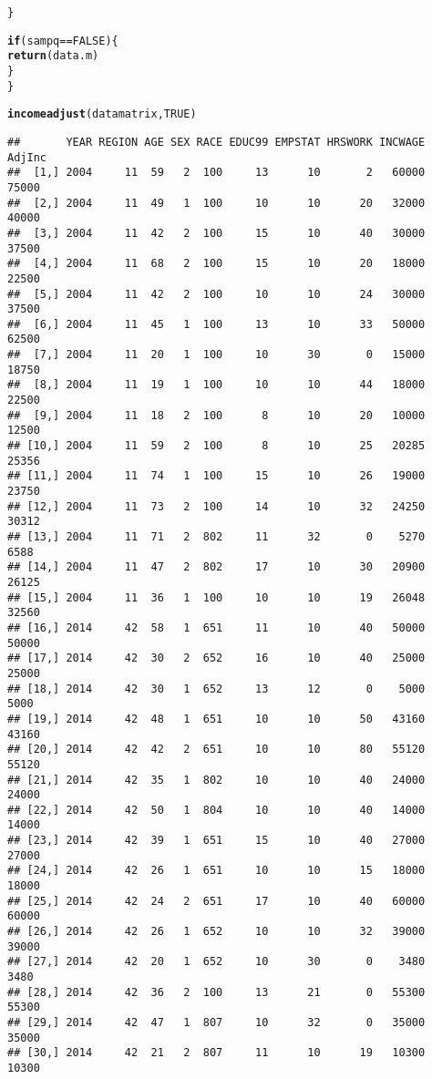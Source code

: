 \documentclass{article}\usepackage[]{graphicx}\usepackage[]{color}
\makeatletter
\newcommand{\hlnum}[1]{\textcolor[rgb]{0.686,0.059,0.569}{#1}}%
\newcommand{\hlopt}[1]{\textcolor[rgb]{0,0,0}{#1}}%
\newcommand{\hlstd}[1]{\textcolor[rgb]{0.345,0.345,0.345}{#1}}%
\newcommand{\hlkwa}[1]{\textcolor[rgb]{0.161,0.373,0.58}{\textbf{#1}}}%
\newcommand{\hlkwd}[1]{\textcolor[rgb]{0.737,0.353,0.396}{\textbf{#1}}}%
\newenvironment{kframe}{%
 \def\at@end@of@kframe{}%
 \ifinner\ifhmode%
  \def\at@end@of@kframe{\end{minipage}}%
  \begin{minipage}{\columnwidth}%
 \fi\fi%
 \def\FrameCommand##1{\hskip\@totalleftmargin \hskip-\fboxsep
 \colorbox{shadecolor}{##1}\hskip-\fboxsep
     \hskip-\linewidth \hskip-\@totalleftmargin \hskip\columnwidth}%
 \MakeFramed {\advance\hsize-\width
   \@totalleftmargin\z@ \linewidth\hsize
   \@setminipage}}%
 {\par\unskip\endMakeFramed%
 \at@end@of@kframe}
\newenvironment{knitrout}{}{} %
\makeatother
\begin{document}
\begin{knitrout}
\begin{kframe}
\begin{alltt}
 \hlstd{\}}

 \hlkwa{if} \hlstd{(sampq} \hlopt{==} \hlnum{FALSE}\hlstd{)\{}
   \hlkwd{return}\hlstd{(data.m)}
 \hlstd{\}}
\hlstd{\}}

\hlkwd{incomeadjust}\hlstd{(datamatrix,} \hlnum{TRUE}\hlstd{)}
\end{alltt}
\begin{verbatim}
##       YEAR REGION AGE SEX RACE EDUC99 EMPSTAT HRSWORK INCWAGE AdjInc
##  [1,] 2004     11  59   2  100     13      10       2   60000  75000
##  [2,] 2004     11  49   1  100     10      10      20   32000  40000
##  [3,] 2004     11  42   2  100     15      10      40   30000  37500
##  [4,] 2004     11  68   2  100     15      10      20   18000  22500
##  [5,] 2004     11  42   2  100     10      10      24   30000  37500
##  [6,] 2004     11  45   1  100     13      10      33   50000  62500
##  [7,] 2004     11  20   1  100     10      30       0   15000  18750
##  [8,] 2004     11  19   1  100     10      10      44   18000  22500
##  [9,] 2004     11  18   2  100      8      10      20   10000  12500
## [10,] 2004     11  59   2  100      8      10      25   20285  25356
## [11,] 2004     11  74   1  100     15      10      26   19000  23750
## [12,] 2004     11  73   2  100     14      10      32   24250  30312
## [13,] 2004     11  71   2  802     11      32       0    5270   6588
## [14,] 2004     11  47   2  802     17      10      30   20900  26125
## [15,] 2004     11  36   1  100     10      10      19   26048  32560
## [16,] 2014     42  58   1  651     11      10      40   50000  50000
## [17,] 2014     42  30   2  652     16      10      40   25000  25000
## [18,] 2014     42  30   1  652     13      12       0    5000   5000
## [19,] 2014     42  48   1  651     10      10      50   43160  43160
## [20,] 2014     42  42   2  651     10      10      80   55120  55120
## [21,] 2014     42  35   1  802     10      10      40   24000  24000
## [22,] 2014     42  50   1  804     10      10      40   14000  14000
## [23,] 2014     42  39   1  651     15      10      40   27000  27000
## [24,] 2014     42  26   1  651     10      10      15   18000  18000
## [25,] 2014     42  24   2  651     17      10      40   60000  60000
## [26,] 2014     42  26   1  652     10      10      32   39000  39000
## [27,] 2014     42  20   1  652     10      30       0    3480   3480
## [28,] 2014     42  36   2  100     13      21       0   55300  55300
## [29,] 2014     42  47   1  807     10      32       0   35000  35000
## [30,] 2014     42  21   2  807     11      10      19   10300  10300
\end{verbatim}
\end{kframe}
\end{knitrout}
\end{document}
